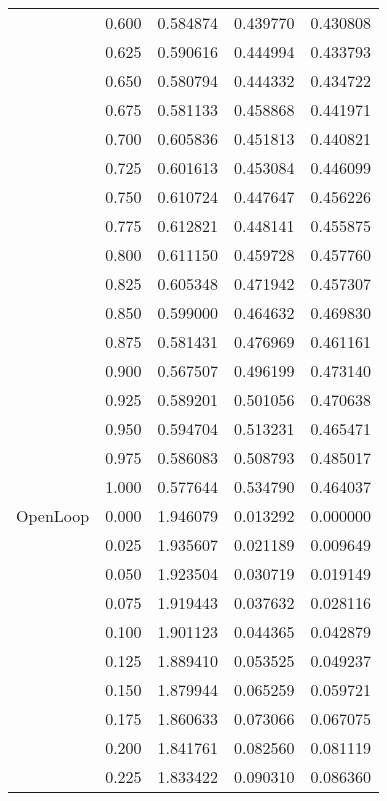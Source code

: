 \begin{tabular}{llrrr}
         & 0.600 &   0.584874 &   0.439770 &   0.430808 \\
         & 0.625 &   0.590616 &   0.444994 &   0.433793 \\
         & 0.650 &   0.580794 &   0.444332 &   0.434722 \\
         & 0.675 &   0.581133 &   0.458868 &   0.441971 \\
         & 0.700 &   0.605836 &   0.451813 &   0.440821 \\
         & 0.725 &   0.601613 &   0.453084 &   0.446099 \\
         & 0.750 &   0.610724 &   0.447647 &   0.456226 \\
         & 0.775 &   0.612821 &   0.448141 &   0.455875 \\
         & 0.800 &   0.611150 &   0.459728 &   0.457760 \\
         & 0.825 &   0.605348 &   0.471942 &   0.457307 \\
         & 0.850 &   0.599000 &   0.464632 &   0.469830 \\
         & 0.875 &   0.581431 &   0.476969 &   0.461161 \\
         & 0.900 &   0.567507 &   0.496199 &   0.473140 \\
         & 0.925 &   0.589201 &   0.501056 &   0.470638 \\
         & 0.950 &   0.594704 &   0.513231 &   0.465471 \\
         & 0.975 &   0.586083 &   0.508793 &   0.485017 \\
         & 1.000 &   0.577644 &   0.534790 &   0.464037 \\
OpenLoop & 0.000 &   1.946079 &   0.013292 &   0.000000 \\
         & 0.025 &   1.935607 &   0.021189 &   0.009649 \\
         & 0.050 &   1.923504 &   0.030719 &   0.019149 \\
         & 0.075 &   1.919443 &   0.037632 &   0.028116 \\
         & 0.100 &   1.901123 &   0.044365 &   0.042879 \\
         & 0.125 &   1.889410 &   0.053525 &   0.049237 \\
         & 0.150 &   1.879944 &   0.065259 &   0.059721 \\
         & 0.175 &   1.860633 &   0.073066 &   0.067075 \\
         & 0.200 &   1.841761 &   0.082560 &   0.081119 \\
         & 0.225 &   1.833422 &   0.090310 &   0.086360 \\

\end{tabular}
